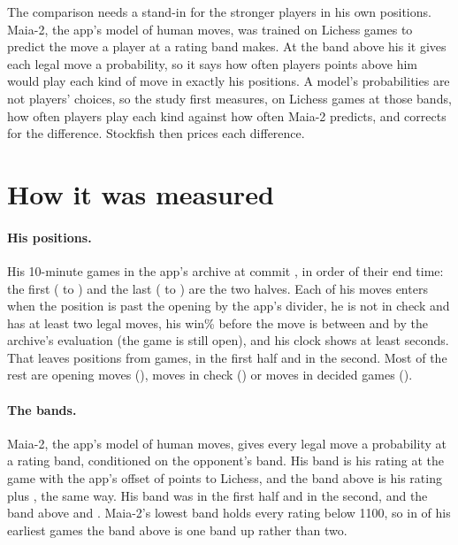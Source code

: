 \documentclass[11pt]{article}
\begin{document}
The comparison needs a stand-in for the stronger players in his own positions. Maia-2, the app's
model of human moves, was trained on Lichess games to predict the move a player at a rating band
makes. At the band above his it gives each legal move a probability, so it says how often players
\Above{} points above him would play each kind of move in exactly his positions. A model's
probabilities are not players' choices, so the study first measures, on Lichess games at those
bands, how often players play each kind against how often Maia-2 predicts, and corrects for the
difference. Stockfish then prices each difference.

\section{How it was measured}

\paragraph{His positions.} His \Games{} 10-minute games in the app's archive at commit
\texttt{\AppCommit}, in order of their end time: the first \GamesFirst{} (\FirstFrom{} to
\FirstTo) and the last \GamesSecond{} (\SecondFrom{} to \SecondTo) are the two halves. Each of his
moves enters when the position is past the opening by the app's divider, he is not in check and
has at least two legal moves, his win\% before the move is between \WinLow{} and \WinHigh{} by
the archive's evaluation (the game is still open), and his clock shows at least \ClockFloor{}
seconds. That leaves \Positions{} positions from \GamesWithPositions{} games, \PositionsFirst{} in
the first half and \PositionsSecond{} in the second. Most of the rest are opening moves
(\SkipOpening), moves in check (\SkipCheck) or moves in decided games (\SkipDecided).

\paragraph{The bands.} Maia-2, the app's model of human moves, gives every legal move a
probability at a rating band, conditioned on the opponent's band. His band is his rating at the
game with the app's offset of \Offset{} points to Lichess, and the band above is his rating plus
\Above{}, the same way. His band was \HisBandsFirst{} in the first half and \HisBandsSecond{} in
the second, and the band above \AboveBandsFirst{} and \AboveBandsSecond. Maia-2's lowest band
holds every rating below 1100, so in \OneStepGames{} of his earliest games the band above is one
band up rather than two.
\end{document}
